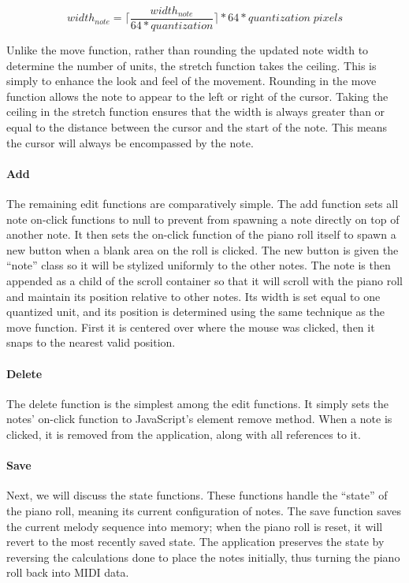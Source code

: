 \begin{equation} \label{stretch_snap}
  width_{note} = \lceil\frac{width_{note}}{64 * quantization}\rceil * 64 * quantization \;pixels
\end{equation}

Unlike the move function, rather than rounding the updated note width to determine the number of
units, the stretch function takes the ceiling. This is simply to enhance the look and feel of the
movement. Rounding in the move function allows the note to appear to the left or right of the
cursor. Taking the ceiling in the stretch function ensures that the width is always greater than or
equal to the distance between the cursor and the start of the note. This means the cursor will
always be encompassed by the note.

\paragraph{Add}

The remaining edit functions are comparatively simple. The add function sets all note on-click
functions to null to prevent from spawning a note directly on top of another note. It then sets the
on-click function of the piano roll itself to spawn a new button when a blank area on the roll is
clicked. The new button is given the “note” class so it will be stylized uniformly to the other
notes. The note is then appended as a child of the scroll container so that it will scroll with the
piano roll and maintain its position relative to other notes. Its width is set equal to one
quantized unit, and its position is determined using the same technique as the move function. First
it is centered over where the mouse was clicked, then it snaps to the nearest valid position.

\paragraph{Delete}

The delete function is the simplest among the edit functions. It simply sets the notes’ on-click
function to JavaScript’s element remove method. When a note is clicked, it is removed from the
application, along with all references to it.

\paragraph{Save}

Next, we will discuss the state functions. These functions handle the “state” of the piano roll,
meaning its current configuration of notes. The save function saves the current melody sequence
into memory; when the piano roll is reset, it will revert to the most recently saved state. The
application preserves the state by reversing the calculations done to place the notes initially,
thus turning the piano roll back into MIDI data.


